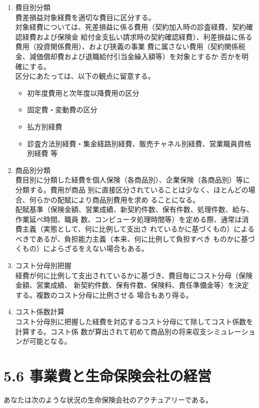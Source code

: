 \documentclass[report,gutter=10mm,fore-edge=10mm,uplatex,dvipdfmx]{jlreq}
\begin{document}
\begin{enumerate}[i]
\item[] 費目別分類\\
 費差損益対象経費を適切な費目に区分する。\\
 対象経費については、死差損益に係る費用（契約加入時の診査経費、契約確認経費および保険金
 給付金支払い請求時の契約確認経費）、利差損益に係る費用（投資関係費用）、および狭義の事業
 費に属さない費用（契約関係税金、減価償却費および退職給付引当金繰入額等）を対象とするか
 否かを明確にする。\\
 区分にあたっては、以下の観点に留意する。
\begin{itemize}
\item[] 初年度費用と次年度以降費用の区分
\item[] 固定費・変動費の区分
\item[] 払方別経費
\item[] 診査方法別経費・集金経路別経費、販売チャネル別経費、営業職員資格別経費 等
\end{itemize} 
\item[] 商品別分類\\
 費目別に分類した経費を個人保険（各商品別）、企業保険（各商品別）等に分類する。費用が商品
 別に直接区分されていることは少なく、ほとんどの場合、何らかの配賦により商品別費用を求め
 ることになる。\\
 配賦基準（保険金額、営業成績、新契約件数、保有件数、処理件数、給与、作業延べ時間、職員
 数、コンピュータ処理時間等）を定める際、通常は消費主義（実態として、何に比例して支出さ
 れているかに基づくもの）によるべきであるが、負担能力主義（本来、何に比例して負担すべき
 ものかに基づくもの）によらざるをえない場合もある。
\item[] コスト分母別把握\\
 経費が何に比例して支出されているかに基づき、費目毎にコスト分母（保険金額、営業成績、
 新契約件数、保有件数、保険料、責任準備金等）を決定する。複数のコスト分母に比例させる
 場合もあり得る。
\item[] コスト係数計算\\
 コスト分母別に把握した経費を対応するコスト分母にて除してコスト係数を計算する。コスト係
 数が算出されて初めて商品別の将来収支シミュレーションが可能となる。
\end{enumerate}

\section{5.6 事業費と生命保険会社の経営}
あなたは次のような状況の生命保険会社のアクチュアリーである。
\end{document}
